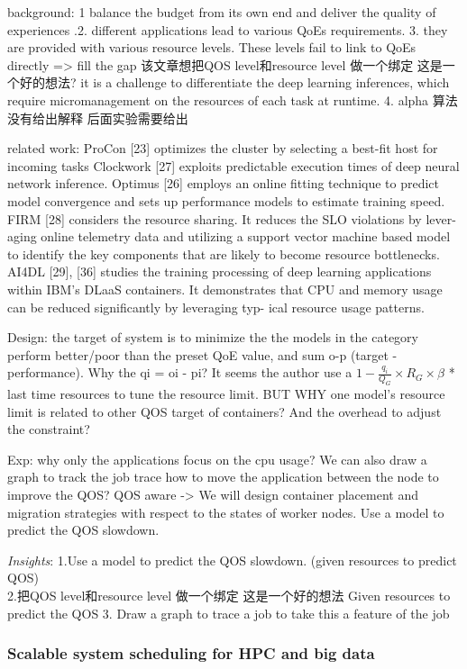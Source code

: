 \documentclass[UTF8]{article}
\begin{document}
background: 1 balance the budget from its own end and deliver the quality of experiences .2. different applications lead to various QoEs requirements. 3. they are provided with various resource levels. These levels fail to link to QoEs directly => fill the gap 该文章想把QOS level和resource level 做一个绑定 这是一个好的想法? it is a challenge to differentiate the deep learning inferences, which require micromanagement on the resources of each task at runtime. 4. alpha 算法没有给出解释 后面实验需要给出

related work: ProCon [23] optimizes the cluster by selecting a best-fit host for incoming tasks Clockwork [27] exploits predictable execution times of deep neural network inference. Optimus [26] employs an online fitting technique to predict model convergence and sets up performance models to estimate training speed.  FIRM [28] considers the resource sharing. It reduces the SLO violations by lever- aging online telemetry data and utilizing a support vector machine based model to identify the key components that are likely to become resource bottlenecks. AI4DL [29], [36] studies the training processing of deep learning applications within IBM’s DLaaS containers. It demonstrates that CPU and memory usage can be reduced significantly by leveraging typ- ical resource usage patterns.

Design: the target of system is to minimize the the models in the category perform better/poor than the preset QoE value, and sum o-p (target - performance).  Why the qi = oi - pi?  It seems the author use a $1− \frac{q_i}{Q_G}×R_G ×β$ * last time resources to tune the resource limit. BUT WHY one model's resource limit is related to other QOS target of containers? And the overhead to adjust the constraint? 

Exp: why only the applications focus on the cpu usage? We can also draw a graph to track the job trace  how to move the application between the node to improve the QOS? QOS aware -> We will design container placement and migration strategies with respect to the states of worker nodes.  Use a model to predict the QOS slowdown.

\emph{Insights}: 
1.Use a model to predict the QOS slowdown. (given resources to predict QOS) \\
2.把QOS level和resource level 做一个绑定 这是一个好的想法 Given resources to predict the QOS
3. Draw a graph to trace a job to take this a feature of the job

\subsubsection{Scalable system scheduling for HPC and big data}
\end{document}

